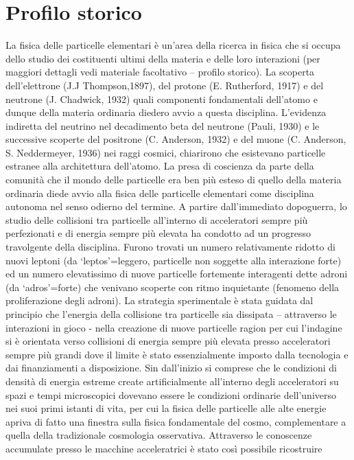 \section{Profilo storico}\label{sec:profilo-storico}

La fisica delle particelle elementari è un’area della ricerca in fisica che si occupa dello studio dei costituenti ultimi della materia e delle loro interazioni (per maggiori dettagli vedi materiale facoltativo – profilo storico).
La scoperta dell’elettrone (J.J Thompson,1897), del protone (E. Rutherford, 1917) e del neutrone (J. Chadwick, 1932) quali componenti fondamentali dell’atomo e dunque della materia ordinaria diedero avvio a questa disciplina.
L’evidenza indiretta del neutrino nel decadimento beta del neutrone (Pauli, 1930) e le successive scoperte del positrone (C. Anderson, 1932) e del muone (C. Anderson, S. Neddermeyer, 1936) nei raggi cosmici, chiarirono che esistevano particelle estranee alla architettura dell’atomo.
La presa di coscienza da parte della comunità che il mondo delle particelle era ben più esteso di quello della materia ordinaria diede avvio alla fisica delle particelle elementari come disciplina autonoma nel senso odierno del termine.
A partire dall’immediato dopoguerra, lo studio delle collisioni tra particelle all’interno di acceleratori sempre più perfezionati e di energia sempre più elevata ha condotto ad un progresso travolgente della disciplina.
Furono trovati un numero relativamente ridotto di nuovi leptoni (da ‘leptos’=leggero, particelle non soggette alla interazione forte) ed un numero elevatissimo di nuove particelle fortemente interagenti dette adroni (da ‘adros’=forte) che venivano scoperte con ritmo inquietante (fenomeno della proliferazione degli adroni).
La strategia sperimentale è stata guidata dal principio che l’energia della collisione tra particelle sia dissipata – attraverso le interazioni in gioco - nella creazione di nuove particelle ragion per cui l’indagine si è orientata verso collisioni di energia sempre più elevata presso acceleratori sempre più grandi dove il limite è stato essenzialmente imposto dalla tecnologia e dai finanziamenti a disposizione.
Sin dall’inizio si comprese che le condizioni di densità di energia estreme create artificialmente all’interno degli acceleratori su spazi e tempi microscopici dovevano essere le condizioni ordinarie dell’universo nei suoi primi istanti di vita, per cui la fisica delle particelle alle alte energie apriva di fatto una finestra sulla fisica fondamentale del cosmo, complementare a quella della tradizionale cosmologia osservativa.
Attraverso le conoscenze accumulate presso le macchine acceleratrici è stato così possibile ricostruire

